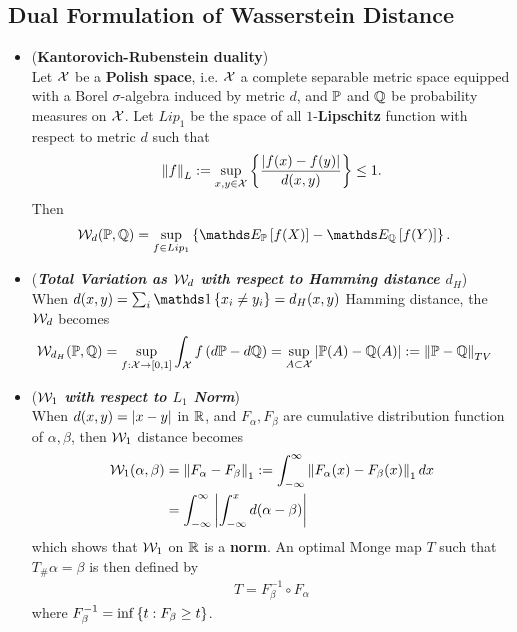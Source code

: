 \documentclass[11pt]{article}
\begin{document}
\subsection{Dual Formulation of Wasserstein Distance}
\begin{itemize}
\item \begin{theorem} (\textbf{Kantorovich-Rubenstein duality}) \citep{villani2009optimal}\\
Let ${\mathcal X}$ be a \textbf{Polish space}, i.e. ${\mathcal X}$ a complete separable metric space equipped with a Borel $\sigma$-algebra induced by metric $d$, and ${\mathbb P}$ and ${\mathbb Q}$ be probability measures on ${\mathcal X}$. Let $Lip_1$ be the space of all 
$1$-\textbf{Lipschitz} function with respect to metric $d$  such that
\begin{align*}
\left\|f\right\|_{L}  := \sup_{x, y \in {\mathcal X}}\left\{\frac{\left\lvert f(x) - f(y) \right\rvert}{d(x, y)}\right\} \le 1.
\end{align*}
Then 
\begin{align}
\cW_{d}(\bP, \bQ) &= \sup_{f \in Lip_1}\set{\E{\bP}{f(X)} - \E{\bQ}{f(Y)}}. \label{eqn: wass_dist_dual}
\end{align} 
\end{theorem}

\item \begin{example} (\textbf{\emph{Total Variation as ${\mathcal W}_d$ with respect to Hamming distance $d_H$}})\\
When $d(x ,y) = \sum_i \ind{x_i \neq y_i} = d_H(x, y)$ Hamming distance, the ${\mathcal W}_d$ becomes
\begin{align*}
{\mathcal W}_{d_H}({\mathbb P}, {\mathbb Q}) &= \sup_{f: {\mathcal X} \to [0, 1]}\int_{{\mathcal X}} f \left(d{\mathbb P} - d{\mathbb Q}\right) = \sup_{A \subset {\mathcal X}}\left\lvert {\mathbb P}(A) - {\mathbb Q}(A) \right\rvert := \left\|{\mathbb P} - {\mathbb Q}\right\|_{TV}
\end{align*}
\end{example}

\item \begin{example} (\textbf{\emph{${\mathcal W}_1$ with respect to $L_1$ Norm}}) \\
When $d(x, y) = \left\lvert x - y \right\rvert$ in ${\mathbb R}$, and $F_{\alpha}, F_{\beta}$ are cumulative distribution function  of $\alpha, \beta$,    then ${\mathcal W}_1$ distance becomes
\begin{align*}
{\mathcal W}_{1}(\alpha, \beta) &=  \left\|F_{\alpha} - F_{\beta}\right\|_{1} := \int_{-\infty}^{\infty}\left\|F_{\alpha}(x) - F_{\beta}(x)\right\|_{1} dx \\
&=  \int_{-\infty}^{\infty}\left\lvert \int_{-\infty}^{x}d(\alpha - \beta)  \right\rvert
\end{align*} which shows that ${\mathcal W}_1$ on ${\mathbb R}$ is a \textbf{norm}. An optimal Monge map $T$ such that $T_{\#}\alpha = \beta$ is then defined by
\begin{align*}
T = F_{\beta}^{-1} \circ  F_{\alpha}   
\end{align*} where $F_{\beta}^{-1} = \inf\left\{t: F_{\beta} \ge t\right\}$.
\end{example}
\end{itemize}
\end{document}

